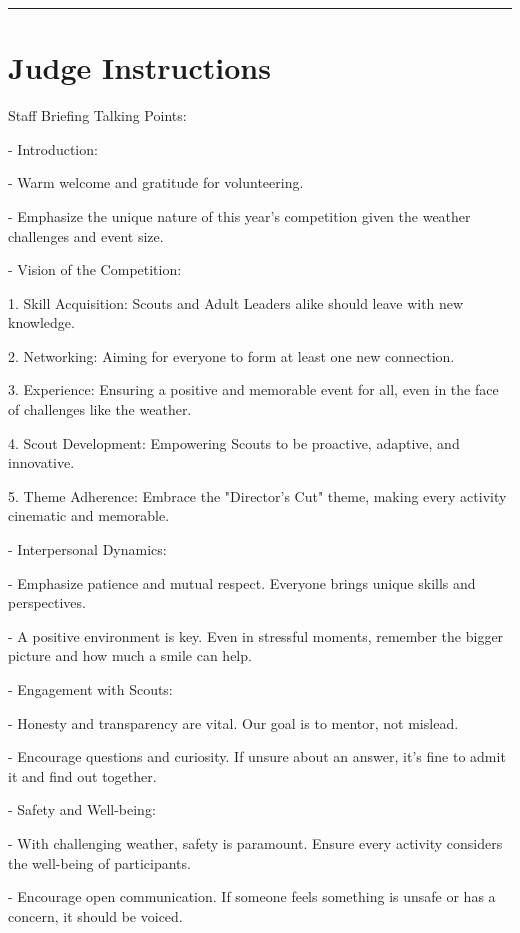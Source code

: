 \documentclass[10pt]{article}
\begin{document}
	\vspace{0.5cm}
	\hrule
	\vspace{0.5cm}

		\section*{Judge Instructions}
		Staff Briefing Talking Points:



- Introduction:

  - Warm welcome and gratitude for volunteering.

  - Emphasize the unique nature of this year's competition given the weather challenges and event size.



- Vision of the Competition:

  1. Skill Acquisition: Scouts and Adult Leaders alike should leave with new knowledge.

  2. Networking: Aiming for everyone to form at least one new connection.

  3. Experience: Ensuring a positive and memorable event for all, even in the face of challenges like the weather.

  4. Scout Development: Empowering Scouts to be proactive, adaptive, and innovative.

  5. Theme Adherence: Embrace the "Director's Cut" theme, making every activity cinematic and memorable.



- Interpersonal Dynamics:

  - Emphasize patience and mutual respect. Everyone brings unique skills and perspectives.

  - A positive environment is key. Even in stressful moments, remember the bigger picture and how much a smile can help.



- Engagement with Scouts:

  - Honesty and transparency are vital. Our goal is to mentor, not mislead.

  - Encourage questions and curiosity. If unsure about an answer, it's fine to admit it and find out together.



- Safety and Well-being:

  - With challenging weather, safety is paramount. Ensure every activity considers the well-being of participants.

  - Encourage open communication. If someone feels something is unsafe or has a concern, it should be voiced.
\end{document}
